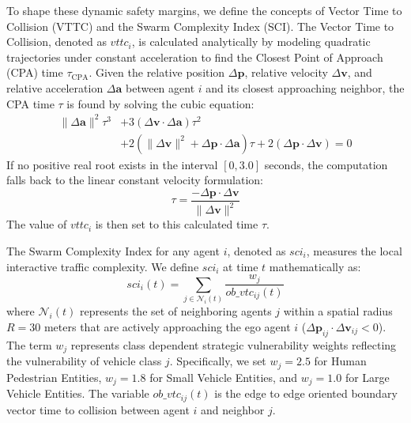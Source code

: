 \documentclass{article}
\begin{document}
To shape these dynamic safety margins, we define the concepts of Vector Time to Collision (VTTC) and the Swarm Complexity Index (SCI). The Vector Time to Collision, denoted as $vttc_i$, is calculated analytically by modeling quadratic trajectories under constant acceleration to find the Closest Point of Approach (CPA) time $\tau_{\text{CPA}}$. Given the relative position $\Delta \mathbf{p}$, relative velocity $\Delta \mathbf{v}$, and relative acceleration $\Delta \mathbf{a}$ between agent $i$ and its closest approaching neighbor, the CPA time $\tau$ is found by solving the cubic equation:
\begin{equation}
\begin{aligned}
\|\Delta \mathbf{a}\|^2 \tau^3 &+ 3 (\Delta \mathbf{v} \cdot \Delta \mathbf{a}) \tau^2 \\
&+ 2 (\|\Delta \mathbf{v}\|^2 + \Delta \mathbf{p} \cdot \Delta \mathbf{a}) \tau + 2 (\Delta \mathbf{p} \cdot \Delta \mathbf{v}) = 0
\end{aligned}
\end{equation}
If no positive real root exists in the interval $[0, 3.0]$ seconds, the computation falls back to the linear constant velocity formulation:
\begin{equation}
\tau = \frac{-\Delta \mathbf{p} \cdot \Delta \mathbf{v}}{\|\Delta \mathbf{v}\|^2}
\end{equation}
The value of $vttc_i$ is then set to this calculated time $\tau$.

The Swarm Complexity Index for any agent $i$, denoted as $sci_i$, measures the local interactive traffic complexity. We define $sci_i$ at time $t$ mathematically as:
\begin{equation}
sci_i(t) = \sum_{j \in \mathcal{N}_i(t)} \frac{w_j}{ob\_vtc_{ij}(t)}
\end{equation}
where $\mathcal{N}_i(t)$ represents the set of neighboring agents $j$ within a spatial radius $R = 30$ meters that are actively approaching the ego agent $i$ ($\Delta \mathbf{p}_{ij} \cdot \Delta \mathbf{v}_{ij} < 0$). The term $w_j$ represents class dependent strategic vulnerability weights reflecting the vulnerability of vehicle class $j$. Specifically, we set $w_j = 2.5$ for Human Pedestrian Entities, $w_j = 1.8$ for Small Vehicle Entities, and $w_j = 1.0$ for Large Vehicle Entities. The variable $ob\_vtc_{ij}(t)$ is the edge to edge oriented boundary vector time to collision between agent $i$ and neighbor $j$.
\end{document}
